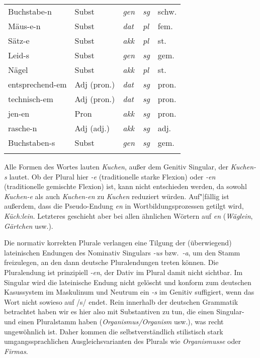 \begin{center}
\begin{tabular}{lllll}
    Buchstabe-n & Subst & \textit{gen} & \textit{sg} & schw. \\
    Mäus-e-n & Subst & \textit{dat} & \textit{pl} & fem. \\
    Sätz-e & Subst & \textit{akk} & \textit{pl} & st. \\
    Leid-s & Subst & \textit{gen} & \textit{sg} & gem. \\
    Nägel & Subst & \textit{akk} & \textit{pl} & st. \\
    entsprechend-em & Adj (pron.) & \textit{dat} & \textit{sg} & pron. \\
    technisch-em & Adj (pron.) & \textit{dat} & \textit{sg} & pron. \\
    jen-en & Pron & \textit{akk} & \textit{sg} & pron. \\
    rasche-n & Adj (adj.) & \textit{akk} & \textit{sg} & adj. \\
    Buchstaben-s & Subst & \textit{gen} & \textit{sg} & gem. \\
    \lspbottomrule
  \end{tabular}
\end{center}

\label{sol:nominalflexion02}

\begin{sloppypar}
Alle Formen des Wortes lauten \textit{Kuchen}, außer dem Genitiv Singular, der \textit{Kuchen-s} lautet.
Ob der Plural hier \textit{-e} (traditionelle starke Flexion) oder \textit{-en} (traditionelle gemischte Flexion) ist, kann nicht entschieden werden, da sowohl \textit{\Ast Kuchen-e} als auch \textit{\Ast Kuchen-en} zu \textit{Kuchen} reduziert würden.
Auf"|fällig ist außerdem, dass die Pseudo-Endung \textit{en} in Wortbildungsprozessen getilgt wird, \zB \textit{Küch:}\textit{lein}.
Letzteres geschieht aber bei allen ähnlichen Wörtern auf \textit{en} (\textit{Wäglein}, \textit{Gärtchen} usw.).
\end{sloppypar}

\label{sol:nominalflexion03}

Die normativ korrekten Plurale verlangen eine Tilgung der (überwiegend) lateinischen Endungen des Nominativ Singulars \textit{-us} bzw.\ \textit{-a}, um den Stamm freizulegen, an den dann deutsche Pluralendungen treten können.
Die Pluralendung ist prinzipiell \textit{-en}, der Dativ im Plural damit nicht sichtbar.
Im Singular wird die lateinische Endung nicht gelöscht und konform zum deutschen Kasussystem im Maskulinum und Neutrum ein \textit{-s} im Genitiv suffigiert, wenn das Wort nicht sowieso auf /s/ endet.
Rein innerhalb der deutschen Grammatik betrachtet haben wir es hier also mit Substantiven zu tun, die einen Singular- und einen Pluralstamm haben (\textit{Organismus\slash Organism} usw.), was recht ungewöhnlich ist.
Daher kommen die selbstverständlich stilistisch stark umgangssprachlichen Ausgleichsvarianten des Plurals wie \textit{Organismusse} oder \textit{Firmas}.

